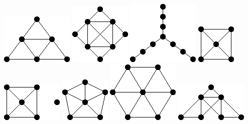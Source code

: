 \documentclass[11pt,paper=b5,footinclude,headinclude]{scrbook} %
\begin{document}
\includegraphics[scale=0.5,frame]{smallGraphs/g_S3.png}     
\includegraphics[scale=0.5,frame]{smallGraphs/g_S4.png}     
\includegraphics[scale=0.5,frame]{smallGraphs/g_T3.png}     
\includegraphics[scale=0.5,frame]{smallGraphs/g_W4.png}     
\includegraphics[scale=0.5,frame]{smallGraphs/g_W4UK1.png}     
\includegraphics[scale=0.5,frame]{smallGraphs/g_W5.png}     
\includegraphics[scale=0.5,frame]{smallGraphs/g_W6.png}     
\includegraphics[scale=0.5,frame]{smallGraphs/g_X1.png}     
\end{document}

